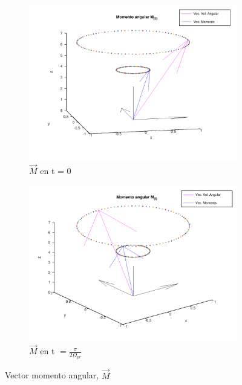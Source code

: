\documentclass[oneside,a4paper,english,links]{amca}
\begin{document}
\begin{figure}[h]
\begin{subfigure}{.55\textwidth}
  \centering
  \includegraphics[width=.77\linewidth]{Figuras/momento_t_0.png}
  \caption{$\vec{M}$ en  t = 0}
\label{fig:cinemat_momento_vectorial_t=0}
\end{subfigure}
\begin{subfigure}{.55\textwidth}
  \centering
  \includegraphics[width=.77\linewidth]{Figuras/momento_t_pi_2omega_prec.png}
  \caption{$\vec{M}$ en t $=\frac{\pi}{2\Omega_{pr}}$}
\label{fig:cinemat_momento_vectorial_t=pi/2omegapr}
\end{subfigure}
\caption{Vector momento angular, $\vec{M}$}
\end{figure}
\end{document}

